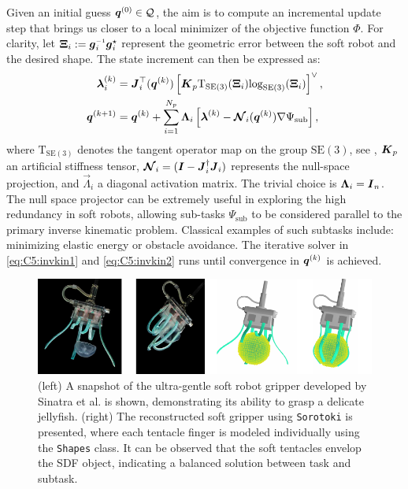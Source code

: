 Given an initial guess ${\boldsymbol{q}}^{(0)} \in \mathcal{Q}$, the aim is to compute an incremental update step that brings us closer to a local minimizer of the objective function $\Phi$. For clarity, let $\vec{\Xi}_i :=\gB\inv_i\gB^\star_i$ represent the geometric error between the soft robot and the desired shape. The state increment can then be expressed as:
%
\begin{align}
\boldsymbol{\lambda}_i^{(k)} & = {\boldsymbol{J}}_i^\top ({\boldsymbol{q}}^{(k)}) \left[ {\boldsymbol{K}}_{p} \textrm{T}_{\textrm{SE}(3)}(\boldsymbol{\Xi}_i) \textrm{log}_{\textrm{SE}(3)} (\boldsymbol{\Xi}_i) \right]^\vee, \label{eq:C5:invkin1}\\
{\boldsymbol{q}}^{(k+1)} & = {\boldsymbol{q}}^{(k)} + \sum^{N_p}_{i = 1} \boldsymbol{\Lambda}_i \left[\boldsymbol{\lambda}^{(k)}  - {\boldsymbol{\mathcal{N}}}_i({\boldsymbol{q}}^{(k)}) \nabla \Psi_{\textrm{sub}} \right],
\label{eq:C5:invkin2}
\end{align}
%
where $\textrm{T}_{\textrm{SE}(3)}$ denotes the tangent operator map on the group $\mathrm{SE}(3)$, see \cite{Bullo1995}, ${\boldsymbol{K}}_p$ an artificial stiffness tensor, ${\boldsymbol{\mathcal{N}}}_i = ({\boldsymbol{I}} - {\boldsymbol{J}}_{i}^\dag{\boldsymbol{J}}_{i})$ represents the null-space projection, and $\vec{\Lambda}_i$ a diagonal activation matrix. The trivial choice is $\boldsymbol{\Lambda}_i = {\boldsymbol{I}}_n$. The null space projector can be extremely useful in exploring the high redundancy in soft robots, allowing sub-tasks $\Psi_\textrm{sub}$ to be considered parallel to the primary inverse kinematic problem. Classical examples of such subtasks include: minimizing elastic energy or obstacle avoidance. The iterative solver in \eqref{eq:C5:invkin1} and \eqref{eq:C5:invkin2} runs until convergence in ${\boldsymbol{q}}^{(k)}$ is achieved. \\

\begin{figure}[!t]
\centering
\includegraphics*[width=.99\textwidth]{./pdf/thesis-figure-6-13.pdf}
%
\caption{\small (left) A snapshot of the ultra-gentle soft robot gripper developed by Sinatra et al. \cite{Sinatra2019Aug} is shown, demonstrating its ability to grasp a delicate jellyfish. (right) The reconstructed soft gripper using \texttt{Sorotoki} is presented, where each tentacle finger is modeled individually using the \texttt{Shapes} class. It can be observed that the soft tentacles envelop the SDF object, indicating a balanced solution between task and subtask.}
\label{fig:C5:shapesexample}
\vspace{-5mm}
\end{figure}

